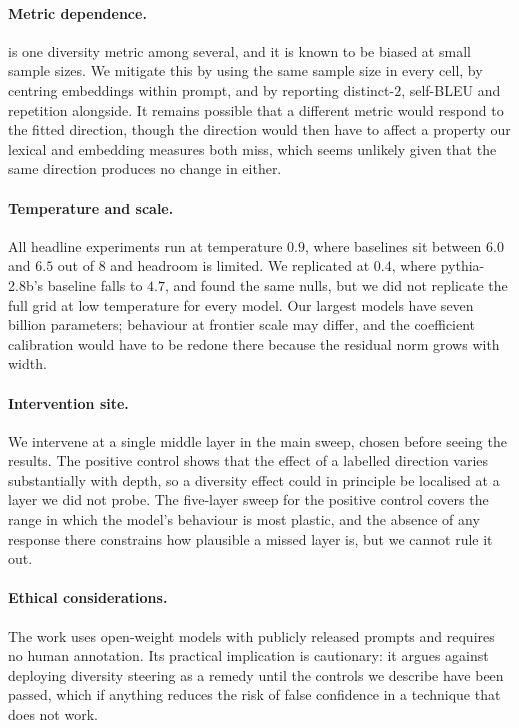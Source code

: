 \paragraph{Metric dependence.}
\vendi{} is one diversity metric among several, and it is known to be biased at small sample sizes.
We mitigate this by using the same sample size in every cell, by centring embeddings within prompt,
and by reporting distinct-$2$, self-BLEU and repetition alongside. It remains possible that a
different metric would respond to the fitted direction, though the direction would then have to
affect a property our lexical and embedding measures both miss, which seems unlikely given that the
same direction produces no change in either.

\paragraph{Temperature and scale.}
All headline experiments run at temperature $0.9$, where \vendi{} baselines sit between $6.0$ and
$6.5$ out of $8$ and headroom is limited. We replicated at $0.4$, where pythia-2.8b's baseline falls
to $4.7$, and found the same nulls, but we did not replicate the full grid at low temperature for
every model. Our largest models have seven billion parameters; behaviour at frontier scale may
differ, and the coefficient calibration would have to be redone there because the residual norm
grows with width.

\paragraph{Intervention site.}
We intervene at a single middle layer in the main sweep, chosen before seeing the results. The
positive control shows that the effect of a labelled direction varies substantially with depth, so a
diversity effect could in principle be localised at a layer we did not probe. The five-layer sweep
for the positive control covers the range in which the model's behaviour is most plastic, and the
absence of any response there constrains how plausible a missed layer is, but we cannot rule it out.

\paragraph{Ethical considerations.}
The work uses open-weight models with publicly released prompts and requires no human annotation.
Its practical implication is cautionary: it argues against deploying diversity steering as a remedy
until the controls we describe have been passed, which if anything reduces the risk of false
confidence in a technique that does not work.


